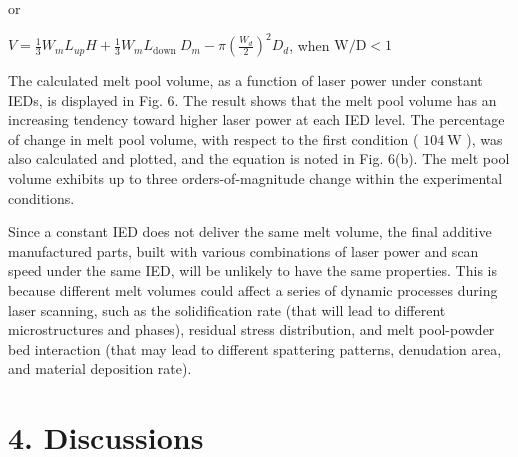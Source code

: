 \documentclass[10pt]{article}
\begin{document}
or

$V=\frac{1}{3} W_{m} L_{u p} H+\frac{1}{3} W_{m} L_{\text {down }} D_{m}-\pi\left(\frac{W_{d}}{2}\right)^{2} D_{d}$, when $\mathrm{W} / \mathrm{D}<1$

The calculated melt pool volume, as a function of laser power under constant IEDs, is displayed in Fig. 6. The result shows that the melt pool volume has an increasing tendency toward higher laser power at each IED level. The percentage of change in melt pool volume, with respect to the first condition ( $104 \mathrm{~W}$ ), was also calculated and plotted, and the equation is noted in Fig. 6(b). The melt pool volume exhibits up to three orders-of-magnitude change within the experimental conditions.

Since a constant IED does not deliver the same melt volume, the final additive manufactured parts, built with various combinations of laser power and scan speed under the same IED, will be unlikely to have the same properties. This is because different melt volumes could affect a series of dynamic processes during laser scanning, such as the solidification rate (that will lead to different microstructures and phases), residual stress distribution, and melt pool-powder bed interaction (that may lead to different spattering patterns, denudation area, and material deposition rate).

\section*{4. Discussions}
\end{document}
